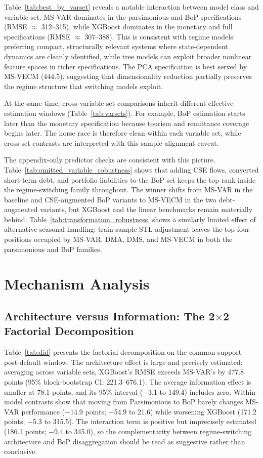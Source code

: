 \documentclass[12pt,a4paper]{article}
\begin{document}
Table~\ref{tab:best_by_varset} reveals a notable interaction between model class and variable set. MS-VAR dominates in the parsimonious and BoP specifications (RMSE $\approx$ 312--315), while XGBoost dominates in the monetary and full specifications (RMSE $\approx$ 307--388). This is consistent with regime models preferring compact, structurally relevant systems where state-dependent dynamics are cleanly identified, while tree models can exploit broader nonlinear feature spaces in richer specifications. The PCA specification is best served by MS-VECM (444.5), suggesting that dimensionality reduction partially preserves the regime structure that switching models exploit.

At the same time, cross-variable-set comparisons inherit different effective estimation windows (Table~\ref{tab:varsets}). For example, BoP estimation starts later than the monetary specification because tourism and remittance coverage begins later. The horse race is therefore clean within each variable set, while cross-set contrasts are interpreted with this sample-alignment caveat.

The appendix-only predictor checks are consistent with this picture. Table~\ref{tab:omitted_variable_robustness} shows that adding CSE flows, converted short-term debt, and portfolio liabilities to the BoP set keeps the top rank inside the regime-switching family throughout. The winner shifts from MS-VAR in the baseline and CSE-augmented BoP variants to MS-VECM in the two debt-augmented variants, but XGBoost and the linear benchmarks remain materially behind. Table~\ref{tab:transformation_robustness} shows a similarly limited effect of alternative seasonal handling: train-sample STL adjustment leaves the top four positions occupied by MS-VAR, DMA, DMS, and MS-VECM in both the parsimonious and BoP families.

\section{Mechanism Analysis}
\label{sec:mechanism}

\subsection{Architecture versus Information: The 2$\times$2 Factorial Decomposition}



Table~\ref{tab:did} presents the factorial decomposition on the common-support post-default window. The architecture effect is large and precisely estimated: averaging across variable sets, XGBoost's RMSE exceeds MS-VAR's by 477.8 points (95\% block-bootstrap CI: 221.3--676.1). The average information effect is smaller at 78.1 points, and its 95\% interval ($-$3.1 to 149.4) includes zero. Within-model contrasts show that moving from Parsimonious to BoP barely changes MS-VAR performance ($-$14.9 points; $-$54.9 to 21.6) while worsening XGBoost (171.2 points; $-$5.3 to 315.5). The interaction term is positive but imprecisely estimated (186.1 points; $-$9.4 to 345.0), so the complementarity between regime-switching architecture and BoP disaggregation should be read as suggestive rather than conclusive.
\end{document}
